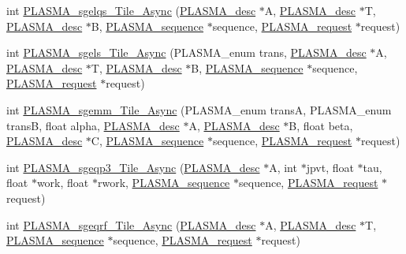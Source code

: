 \begin{DoxyCompactItemize}
\item 
int \hyperlink{group__float__Tile__Async_ga3163bc7f3ca8713217401f54956768c2_ga3163bc7f3ca8713217401f54956768c2}{P\+L\+A\+S\+M\+A\+\_\+sgelqs\+\_\+\+Tile\+\_\+\+Async} (\hyperlink{structplasma__desc__t}{P\+L\+A\+S\+M\+A\+\_\+desc} $\ast$A, \hyperlink{structplasma__desc__t}{P\+L\+A\+S\+M\+A\+\_\+desc} $\ast$T, \hyperlink{structplasma__desc__t}{P\+L\+A\+S\+M\+A\+\_\+desc} $\ast$B, \hyperlink{structplasma__sequence__t}{P\+L\+A\+S\+M\+A\+\_\+sequence} $\ast$sequence, \hyperlink{structplasma__request__t}{P\+L\+A\+S\+M\+A\+\_\+request} $\ast$request)
\item 
int \hyperlink{group__float__Tile__Async_gae5517496f2ab1a5c3c35705384454eb7_gae5517496f2ab1a5c3c35705384454eb7}{P\+L\+A\+S\+M\+A\+\_\+sgels\+\_\+\+Tile\+\_\+\+Async} (P\+L\+A\+S\+M\+A\+\_\+enum trans, \hyperlink{structplasma__desc__t}{P\+L\+A\+S\+M\+A\+\_\+desc} $\ast$A, \hyperlink{structplasma__desc__t}{P\+L\+A\+S\+M\+A\+\_\+desc} $\ast$T, \hyperlink{structplasma__desc__t}{P\+L\+A\+S\+M\+A\+\_\+desc} $\ast$B, \hyperlink{structplasma__sequence__t}{P\+L\+A\+S\+M\+A\+\_\+sequence} $\ast$sequence, \hyperlink{structplasma__request__t}{P\+L\+A\+S\+M\+A\+\_\+request} $\ast$request)
\item 
int \hyperlink{group__float__Tile__Async_gafb0f19cbe49220b6fe40213c9b612f65_gafb0f19cbe49220b6fe40213c9b612f65}{P\+L\+A\+S\+M\+A\+\_\+sgemm\+\_\+\+Tile\+\_\+\+Async} (P\+L\+A\+S\+M\+A\+\_\+enum trans\+A, P\+L\+A\+S\+M\+A\+\_\+enum trans\+B, float alpha, \hyperlink{structplasma__desc__t}{P\+L\+A\+S\+M\+A\+\_\+desc} $\ast$A, \hyperlink{structplasma__desc__t}{P\+L\+A\+S\+M\+A\+\_\+desc} $\ast$B, float beta, \hyperlink{structplasma__desc__t}{P\+L\+A\+S\+M\+A\+\_\+desc} $\ast$C, \hyperlink{structplasma__sequence__t}{P\+L\+A\+S\+M\+A\+\_\+sequence} $\ast$sequence, \hyperlink{structplasma__request__t}{P\+L\+A\+S\+M\+A\+\_\+request} $\ast$request)
\item 
int \hyperlink{group__float__Tile__Async_gad7f0d63f6ee3f7398131d0d8c9ee5eb4_gad7f0d63f6ee3f7398131d0d8c9ee5eb4}{P\+L\+A\+S\+M\+A\+\_\+sgeqp3\+\_\+\+Tile\+\_\+\+Async} (\hyperlink{structplasma__desc__t}{P\+L\+A\+S\+M\+A\+\_\+desc} $\ast$A, int $\ast$jpvt, float $\ast$tau, float $\ast$work, float $\ast$rwork, \hyperlink{structplasma__sequence__t}{P\+L\+A\+S\+M\+A\+\_\+sequence} $\ast$sequence, \hyperlink{structplasma__request__t}{P\+L\+A\+S\+M\+A\+\_\+request} $\ast$request)
\item 
int \hyperlink{group__float__Tile__Async_ga494b58b8d9bfb2c9c9edb0dcde0ace11_ga494b58b8d9bfb2c9c9edb0dcde0ace11}{P\+L\+A\+S\+M\+A\+\_\+sgeqrf\+\_\+\+Tile\+\_\+\+Async} (\hyperlink{structplasma__desc__t}{P\+L\+A\+S\+M\+A\+\_\+desc} $\ast$A, \hyperlink{structplasma__desc__t}{P\+L\+A\+S\+M\+A\+\_\+desc} $\ast$T, \hyperlink{structplasma__sequence__t}{P\+L\+A\+S\+M\+A\+\_\+sequence} $\ast$sequence, \hyperlink{structplasma__request__t}{P\+L\+A\+S\+M\+A\+\_\+request} $\ast$request)

\end{DoxyCompactItemize}
